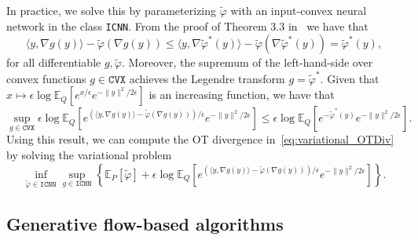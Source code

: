 \documentclass{amsart}
\theoremstyle{definition}
\theoremstyle{remark}
\numberwithin{equation}{section}
\begin{document}
In practice, we solve this by parameterizing $\widetilde\varphi$ with an input-convex neural network in the class \texttt{ICNN}. From the proof of Theorem 3.3 in~\cite{makkuva2020optimal} we have that
$$\langle y, \nabla g(y)\rangle - \widetilde\varphi(\nabla g(y)) \leq \langle y, \nabla \widetilde\varphi^*(y)\rangle - \widetilde\varphi(\nabla \widetilde\varphi^*(y)) = \widetilde\varphi^*(y),$$
for all differentiable $g,\widetilde\varphi$. Moreover, the supremum of the left-hand-side over convex functions $g \in \texttt{CVX}$ achieves the Legendre transform $g=\widetilde\varphi^*$.
Given that $x \mapsto \epsilon\log \mathbb{E}_Q[e^{x/\epsilon}e^{-\|y\|^2/2\epsilon}]$ is an increasing function, we have that 
$$\sup_{g \in \texttt{CVX}}\epsilon\log \mathbb{E}_Q[e^{(\langle y, \nabla g(y)\rangle - \widetilde\varphi(\nabla g(y)))/\epsilon}e^{-\|y\|^2/2\epsilon}] \leq \epsilon\log \mathbb{E}_Q[e^{-\widetilde\varphi^*(y)}e^{-\|y\|^2/2\epsilon}].$$
Using this result, we can compute the OT divergence in~\eqref{eq:variational_OTDiv} by solving the variational problem
\begin{equation}\label{pOT:ICNN}\inf_{\widetilde\varphi \in \texttt{ICNN}} \sup_{g \in \texttt{ICNN}} \left\{\mathbb{E}_P[\widetilde\varphi] + \epsilon \log \mathbb{E}_Q[e^{(\langle y, \nabla g(y)\rangle - \widetilde\varphi(\nabla g(y)))/\epsilon}e^{-\|y\|^2/2\epsilon}] \right\}.
\end{equation}


\subsection{Generative flow-based algorithms}\label{sec:algorithms.MFG}

\end{document}

